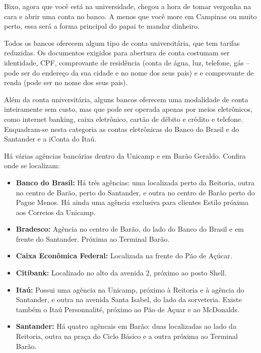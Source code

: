 Bixo, agora que você está na universidade, chegou a hora de tomar vergonha na
cara e abrir uma conta no banco. A menos que você more em Campinas ou muito
perto, essa será a forma principal do papai te mandar dinheiro.

Todos os bancos oferecem algum tipo de conta universitária, que tem tarifas
reduzidas. Os documentos exigidos para abertura de conta costumam ser
identidade, CPF, comprovante de residência (conta de água, luz, telefone, gás --
pode ser do endereço da sua cidade e no nome dos seus pais) e e comprovante de
renda (pode ser no nome dos seus pais).

Além da conta universitária, alguns bancos oferecem uma modalidade de conta
inteiramente sem custo, mas que pode ser operada apenas por meios eletrônicos,
como internet banking, caixa eletrônico, cartão de débito e crédito e telefone.
Enquadram-se nesta categoria as contas eletrônicas do Banco do Brasil e do
Santander e a iConta do Itaú.

Há várias agências bancárias dentro da Unicamp e em Barão Geraldo. Confira onde
se localizam:

\begin{itemize}
    \item  \textbf{Banco do Brasil:} Há três agências: uma localizada perto da
        Reitoria, outra no centro de Barão, perto do Santander, e outra no
        centro de Barão perto do Pague Menos. Há ainda uma agência exclusiva
        para clientes Estilo próxima aos Correios da Unicamp.

    \item  \textbf{Bradesco:} Agência no centro de Barão, do lado do Banco do
        Brasil e em frente do Santander. Próxima ao Terminal Barão.

    \item  \textbf{Caixa Econômica Federal:} Localizada na frente do Pão de
        Açúcar.

    \item  \textbf{Citibank:} Localizado no alto da avenida 2, próximo ao posto
        Shell.

    \item  \textbf{Itaú:} Possui uma agência na Unicamp, próximo à Reitoria e à
        agência do Santander, e outra na avenida Santa Isabel, do lado da
        sorveteria. Existe também o Itaú Personnalité, próximo ao Pão de Açuar e
        ao McDonalds.

    \item  \textbf{Santander:} Há quatro agêncais em Barão: duas localizadas ao
        lado da Reitoria, outra na praça do Ciclo Básico e a outra próxima ao
        Terminal Barão.
\end{itemize}

